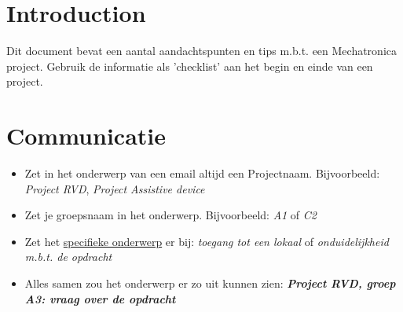 \documentclass[24pt,a4paper]{article}
\begin{document}
\captionsetup[table]{labelsep=endash}
\captionsetup[figure]{labelsep=endash}

\pagestyle{default}


\section{Introduction}
Dit document bevat een aantal aandachtspunten en tips m.b.t. een Mechatronica project.
Gebruik de informatie als 'checklist' aan het begin en einde van een project.


\section{Communicatie}
\begin{itemize}
      \item Zet in het onderwerp van een email altijd een Projectnaam. Bijvoorbeeld: \textit{Project RVD}, \textit{Project Assistive device}
      \item Zet je groepsnaam in het onderwerp. Bijvoorbeeld: \textit{A1} of \textit{C2}
      \item Zet het \underline{specifieke onderwerp} er bij: \textit{toegang tot een lokaal} of \textit{onduidelijkheid m.b.t. de opdracht}
      \item Alles samen zou het onderwerp er zo uit kunnen zien: \newline
            \textbf{\textit{Project RVD, groep A3: vraag over de opdracht}
            }\end{itemize}
\end{document}
